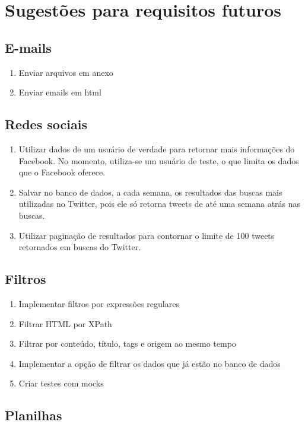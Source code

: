 \section{Sugestões para requisitos futuros}
\subsection{E-mails}
\begin{enumerate}
\item Enviar arquivos em anexo
\item Enviar emails em html
\end{enumerate}

\subsection{Redes sociais}
\begin{enumerate}
\item Utilizar dados de um usuário de verdade para retornar mais informações do Facebook. No momento, utiliza-se um usuário de teste, o que limita os dados que o Facebook oferece.
\item Salvar no banco de dados, a cada semana, os resultados das buscas mais utilizadas no Twitter, pois ele só retorna tweets de até uma semana atrás nas buscas.
\item Utilizar paginação de resultados para contornar o limite de 100 tweets retornados em buscas do Twitter.
\end{enumerate}

\subsection{Filtros}
\begin{enumerate}
\item Implementar filtros por expressões regulares
\item Filtrar HTML por XPath
\item Filtrar por conteúdo, título, tags e origem ao mesmo tempo
\item Implementar a opção de filtrar os dados que já estão no banco de dados
\item Criar testes com mocks
\end{enumerate}

\subsection{Planilhas}

